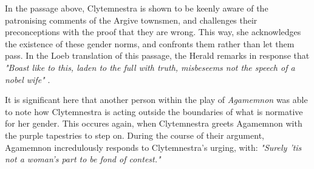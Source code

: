\noindent
In the passage above, Clytemnestra is shown to be keenly aware of the
patronising comments of the Argive townsmen, and challenges their preconceptions
with the proof that they are wrong. This way, she acknowledges the existence of
these gender norms, and confronts them rather than let them pass. In the Loeb
translation of this passage, the Herald remarks in response that \emph{"Boast
like to this, laden to the full with truth, misbeseems not the speech of a
nobel wife"} \autocite[613]{loeb}.

\noindent
It is significant here that another person within the play of \emph{Agamemnon}
was able to note how Clytemnestra is acting outside the boundaries of what is
normative for her gender. This occures again, when Clytemnestra greets
Agamemnon with the purple tapestries to step on. During the course of their
argument, Agamemnon incredulously responds to Clytemnestra's urging, with:
\emph{"Surely 'tis not a woman's part to be fond of contest."}
\autocite[940]{loeb}
